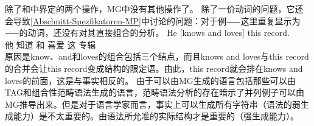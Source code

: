 除了和中界定的两个操作，MG中没有其他操作了。
除了一价动词的问题，它还会导致\ref{Abschnitt-Spezfikatoren-MP}中讨论的问题：对于例⸺这里重复显示为⸺的动词，还没有对其直接组合的分析。
\ea
\label{ex-he-knows-and-loves-this-record-MP-zwei}
\gll He [knows and loves] this record.\\
     他 \spacebr{}知道 和 喜爱 这 专辑\\
\z
原因是know、and和loves的组合包括三个结点，而且knows and loves与this record的合并会让this record变成结构的限定语。由此，this record就会排在knows and loves的前面，这是与事实相反的。
由于可以由MG生成的语言包括那些可以由TAG\indextag 和组合性范畴语法\indexcg \citep{Michaelis2001a-u}生成的语言，范畴语法分析的存在暗示了并列例子可以由MG推导出来。但是对于语言学家而言，事实上可以生成所有字符串（语法的弱生成能力）是不太重要的。由语法所允准的实际结构才是重要的（强生成能力）。

